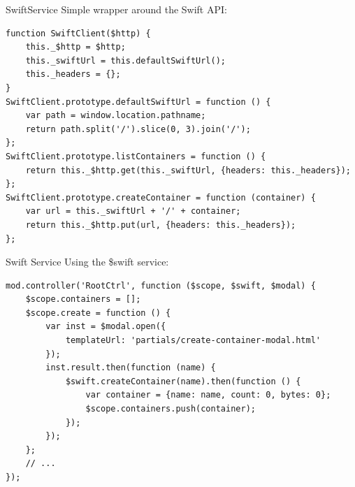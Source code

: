 \documentclass[t,noamsthm]{beamer}
\newcommand{\code}[1]{#1}
\begin{document}
\begin{frame}[fragile]{SwiftService}
  Simple wrapper around the Swift API:
\begin{lstlisting}
function SwiftClient($http) {
    this._$http = $http;
    this._swiftUrl = this.defaultSwiftUrl();
    this._headers = {};
}
SwiftClient.prototype.defaultSwiftUrl = function () {
    var path = window.location.pathname;
    return path.split('/').slice(0, 3).join('/');
};
SwiftClient.prototype.listContainers = function () {
    return this._$http.get(this._swiftUrl, {headers: this._headers});
};
SwiftClient.prototype.createContainer = function (container) {
    var url = this._swiftUrl + '/' + container;
    return this._$http.put(url, {headers: this._headers});
};
\end{lstlisting}
\end{frame}

\begin{frame}[fragile]{Swift Service}
Using the \code{\$swift} service:
\begin{lstlisting}
mod.controller('RootCtrl', function ($scope, $swift, $modal) {
    $scope.containers = [];
    $scope.create = function () {
        var inst = $modal.open({
            templateUrl: 'partials/create-container-modal.html'
        });
        inst.result.then(function (name) {
            $swift.createContainer(name).then(function () {
                var container = {name: name, count: 0, bytes: 0};
                $scope.containers.push(container);
            });
        });
    };
    // ...
});
\end{lstlisting}
\end{frame}
\end{document}
